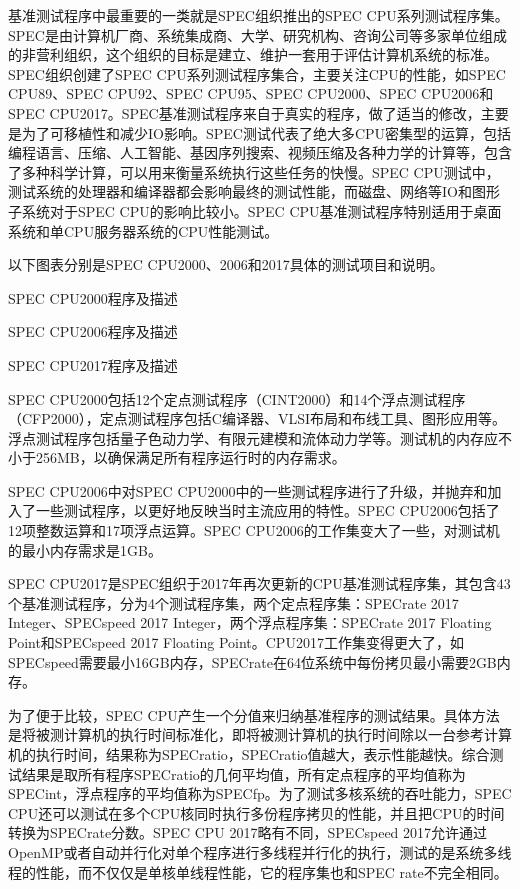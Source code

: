 \documentclass[]{ctexbook}
\begin{document}
基准测试程序中最重要的一类就是SPEC组织推出的SPEC CPU系列测试程序集。SPEC是由计算机厂商、系统集成商、大学、研究机构、咨询公司等多家单位组成的非营利组织，这个组织的目标是建立、维护一套用于评估计算机系统的标准。SPEC组织创建了SPEC CPU系列测试程序集合，主要关注CPU的性能，如SPEC CPU89、SPEC CPU92、SPEC CPU95、SPEC CPU2000、SPEC CPU2006和SPEC CPU2017。SPEC基准测试程序来自于真实的程序，做了适当的修改，主要是为了可移植性和减少IO影响。SPEC测试代表了绝大多CPU密集型的运算，包括编程语言、压缩、人工智能、基因序列搜索、视频压缩及各种力学的计算等，包含了多种科学计算，可以用来衡量系统执行这些任务的快慢。SPEC CPU测试中，测试系统的处理器和编译器都会影响最终的测试性能，而磁盘、网络等IO和图形子系统对于SPEC CPU的影响比较小。SPEC CPU基准测试程序特别适用于桌面系统和单CPU服务器系统的CPU性能测试。

以下图表分别是SPEC CPU2000、2006和2017具体的测试项目和说明。

\label{tab:SPEC2000}SPEC CPU2000程序及描述

\label{tab:SPEC2006}SPEC CPU2006程序及描述

\label{tab:SPEC2017}SPEC CPU2017程序及描述

SPEC CPU2000包括12个定点测试程序（CINT2000）和14个浮点测试程序（CFP2000），定点测试程序包括C编译器、VLSI布局和布线工具、图形应用等。浮点测试程序包括量子色动力学、有限元建模和流体动力学等。测试机的内存应不小于256MB，以确保满足所有程序运行时的内存需求。

SPEC CPU2006中对SPEC CPU2000中的一些测试程序进行了升级，并抛弃和加入了一些测试程序，以更好地反映当时主流应用的特性。SPEC CPU2006包括了12项整数运算和17项浮点运算。SPEC CPU2006的工作集变大了一些，对测试机的最小内存需求是1GB。

SPEC CPU2017是SPEC组织于2017年再次更新的CPU基准测试程序集，其包含43个基准测试程序，分为4个测试程序集，两个定点程序集：SPECrate 2017 Integer、SPECspeed 2017 Integer，两个浮点程序集：SPECrate 2017 Floating Point和SPECspeed 2017 Floating Point。CPU2017工作集变得更大了，如SPECspeed需要最小16GB内存，SPECrate在64位系统中每份拷贝最小需要2GB内存。

为了便于比较，SPEC CPU产生一个分值来归纳基准程序的测试结果。具体方法是将被测计算机的执行时间标准化，即将被测计算机的执行时间除以一台参考计算机的执行时间，结果称为SPECratio，SPECratio值越大，表示性能越快。综合测试结果是取所有程序SPECratio的几何平均值，所有定点程序的平均值称为SPECint，浮点程序的平均值称为SPECfp。为了测试多核系统的吞吐能力，SPEC CPU还可以测试在多个CPU核同时执行多份程序拷贝的性能，并且把CPU的时间转换为SPECrate分数。SPEC CPU 2017略有不同，SPECspeed 2017允许通过OpenMP或者自动并行化对单个程序进行多线程并行化的执行，测试的是系统多线程的性能，而不仅仅是单核单线程性能，它的程序集也和SPEC rate不完全相同。
\end{document}
